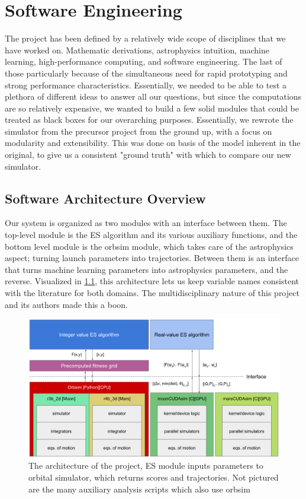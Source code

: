 
\chapter{Software Engineering}

The project has been defined by a relatively wide scope of disciplines that we have worked on. Mathematic derivations, astrophysics intuition, machine learning, high-performance computing, and software engineering. The last of those particularly because of the simultaneous need for rapid prototyping and strong performance characteristics. Essentially, we needed to be able to test a plethora of different ideas to answer all our questions, but since the computations are so relatively expensive, we wanted to build a few solid modules that could be treated as black boxes for our overarching purposes. Essentially, we rewrote the simulator from the precursor project from the ground up, with a focus on modularity and extensibility. This was done on basis of the model inherent in the original, to give us a consistent "ground truth" with which to compare our new simulator.


\section{Software Architecture Overview}
Our system is organized as two modules with an interface between them. The top-level module is the ES algorithm and its various auxiliary functions, and the bottom level module is the orbsim module, which takes care of the astrophysics aspect; turning launch parameters into trajectories. Between them is an interface that turns machine learning parameters into astrophysics parameters, and the reverse. Visualized in \cref{fig:software_architecture}, this architecture lets us keep variable names consistent with the literature for both domains. The multidisciplinary nature of this project and its authors made this a boon.

\begin{figure}
    \centering
    \includegraphics[width=\linewidth]{fig/software_architecture}
    \caption{The architecture of the project, ES module inputs parameters to orbital simulator, which returns scores and trajectories. Not pictured are the many auxiliary analysis scripts which also use orbsim}
    \label{fig:software_architecture}
\end{figure}

